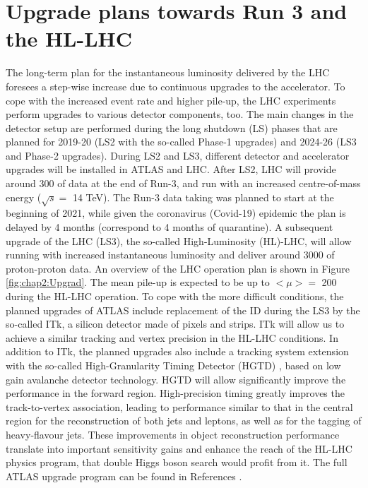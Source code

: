 \section{Upgrade plans towards Run 3 and the HL-LHC}
\label{chap2:Upgrad}
The long-term plan for the instantaneous luminosity delivered by the LHC foresees a step-wise increase due to continuous upgrades to the accelerator. To cope with the increased event rate and higher pile-up, the LHC experiments perform upgrades to various detector components, too. The main changes in the detector setup are performed during the long shutdown (LS) phases that are planned for 2019-20 (LS2 with the so-called Phase-1 upgrades) and 2024-26 (LS3 and Phase-2 upgrades). During LS2 and LS3, different detector and accelerator upgrades will be installed in ATLAS and LHC. After LS2, LHC will provide around 300 \ifb of data at the end of Run-3, and run with an increased centre-of-mass energy ($\sqrt{s} = $ 14 TeV). The Run-3 data taking was planned to start at the beginning of 2021, while given the coronavirus (Covid-19) epidemic the plan is delayed by 4 months (correspond to 4 months of quarantine).  A subsequent upgrade of the LHC (LS3), the so-called High-Luminosity (HL)-LHC, will allow running with increased instantaneous luminosity and deliver around 3000 \ifb of proton-proton data.  An overview of the LHC operation plan is shown in Figure \ref{fig:chap2:Upgrad}. The mean pile-up is expected to be up to  $<\mu> = $ 200 during the HL-LHC operation. To cope with the more difficult conditions, the planned upgrades of ATLAS include replacement of the ID during the LS3 by the so-called ITk, a silicon detector made of pixels and strips. ITk will allow us to achieve a similar tracking and vertex precision in the HL-LHC conditions. In addition to ITk, the planned upgrades also include a tracking system extension with the so-called High-Granularity Timing Detector (HGTD) \cite{HGTD}, based on low gain avalanche detector technology. HGTD will allow significantly improve the performance in the forward region.  High-precision timing greatly improves the track-to-vertex association, leading to performance similar to that in the central region for the reconstruction of both jets and leptons, as well as for the tagging of heavy-flavour jets. These improvements in object reconstruction performance translate into important sensitivity gains and enhance the reach of the HL-LHC physics program, that double Higgs boson search would profit from it. The full ATLAS upgrade program can be found in References \cite{CERN-LHCC-2015-020, CERN-LHCC-2017-005, CERN-LHCC-2017-017, CERN-LHCC-2017-018, CERN-LHCC-2017-019, CERN-LHCC-2017-020, CERN-LHCC-2017-021}.

